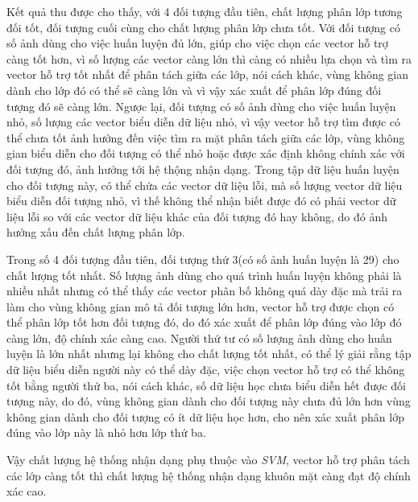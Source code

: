 \documentclass[12pt,a4paper]{article}
\begin{document}
Kết quả thu được cho thấy, với 4 đối tượng đầu tiên, chất lượng phân lớp tương đối tốt, đối tượng cuối cùng cho chất lượng phân lớp chưa tốt. Với đối tượng có số ảnh dùng cho việc huấn luyện đủ lớn, giúp cho việc chọn các vector hỗ trợ càng tốt hơn, vì số lượng các vector càng lớn thì càng có nhiều lựa chọn và tìm ra vector hỗ trợ tốt nhất để phân tách giữa các lớp, nói cách khác, vùng không gian dành cho lớp đó có thể sẽ càng lớn và vì vậy xác xuất để phân lớp đúng đối tượng đó sẽ càng lớn. Ngược lại, đối tượng có số ảnh dùng cho việc huấn luyện nhỏ, số lượng các vector biểu diễn dữ liệu nhỏ, vì vậy vector hỗ trợ tìm được có thể chưa tốt ảnh hưởng đến việc tìm ra mặt phân tách giữa các lớp, vùng không gian biểu diễn cho đối tượng có thể nhỏ hoặc được xác định không chính xác với đối tượng đó, ảnh hưởng tới hệ thộng nhận dạng. Trong tập dữ liệu huấn luyện cho đối tượng này, có thể chứa các vector dữ liệu lỗi, mà số lượng vector dữ liệu biểu diễn đối tượng nhỏ, vì thế không thể nhận biết được đó có phải vector dữ liệu lỗi so với các vector dữ liệu khác của đối tượng đó hay không, do đó ảnh hưởng xấu đến chất lượng phân lớp. \par 
Trong số 4 đối tượng đầu tiên, đối tượng thứ 3(có số ảnh huấn luyện là 29) cho chất lượng tốt nhất. Số lượng ảnh dùng cho quá trình huấn luyện không phải là nhiều nhất nhưng có thể thấy các vector phân bố không quá dày đặc mà trải ra làm cho vùng không gian mô tả đối tượng lớn hơn, vector hỗ trợ được chọn có thể phân lớp tốt hơn đối tượng đó, do đó xác xuất để phân lớp đúng vào lớp đó càng lớn, độ chính xác càng cao. Người thứ tư có số lượng ảnh dùng cho huấn luyện là lớn nhất nhưng lại không cho chất lượng tốt nhất, có thể lý giải rằng tập dữ liệu biểu diễn người này có thể dày đặc, việc chọn vector hỗ trợ có thể không tốt bằng người thứ ba, nói cách khác, số dữ liệu học chưa biểu diễn hết được đối tượng này, do đó, vùng không gian dành cho đối tượng này chưa đủ lớn hơn vùng không gian dành cho đối tượng có ít dữ liệu học hơn, cho nên xác xuất phân lớp đúng vào lớp này là nhỏ hơn lớp thứ ba.\par 
Vậy chất lượng hệ thống nhận dạng phụ thuộc vào \textit{SVM}, vector hỗ trợ phân tách các lớp càng tốt thì chất lượng hệ thống nhận dạng khuôn mặt càng đạt độ chính xác cao. \par 

\newpage
\end{document}
